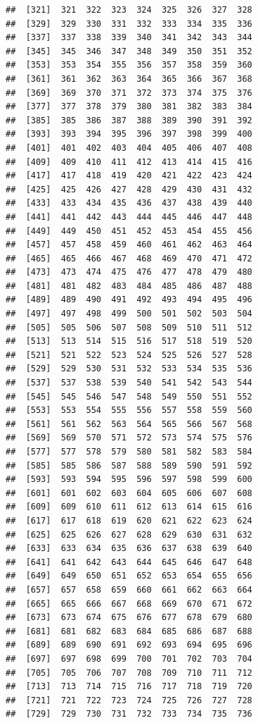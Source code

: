 \documentclass[
]{book}
\begin{document}
\begin{verbatim}
##  [321]  321  322  323  324  325  326  327  328
##  [329]  329  330  331  332  333  334  335  336
##  [337]  337  338  339  340  341  342  343  344
##  [345]  345  346  347  348  349  350  351  352
##  [353]  353  354  355  356  357  358  359  360
##  [361]  361  362  363  364  365  366  367  368
##  [369]  369  370  371  372  373  374  375  376
##  [377]  377  378  379  380  381  382  383  384
##  [385]  385  386  387  388  389  390  391  392
##  [393]  393  394  395  396  397  398  399  400
##  [401]  401  402  403  404  405  406  407  408
##  [409]  409  410  411  412  413  414  415  416
##  [417]  417  418  419  420  421  422  423  424
##  [425]  425  426  427  428  429  430  431  432
##  [433]  433  434  435  436  437  438  439  440
##  [441]  441  442  443  444  445  446  447  448
##  [449]  449  450  451  452  453  454  455  456
##  [457]  457  458  459  460  461  462  463  464
##  [465]  465  466  467  468  469  470  471  472
##  [473]  473  474  475  476  477  478  479  480
##  [481]  481  482  483  484  485  486  487  488
##  [489]  489  490  491  492  493  494  495  496
##  [497]  497  498  499  500  501  502  503  504
##  [505]  505  506  507  508  509  510  511  512
##  [513]  513  514  515  516  517  518  519  520
##  [521]  521  522  523  524  525  526  527  528
##  [529]  529  530  531  532  533  534  535  536
##  [537]  537  538  539  540  541  542  543  544
##  [545]  545  546  547  548  549  550  551  552
##  [553]  553  554  555  556  557  558  559  560
##  [561]  561  562  563  564  565  566  567  568
##  [569]  569  570  571  572  573  574  575  576
##  [577]  577  578  579  580  581  582  583  584
##  [585]  585  586  587  588  589  590  591  592
##  [593]  593  594  595  596  597  598  599  600
##  [601]  601  602  603  604  605  606  607  608
##  [609]  609  610  611  612  613  614  615  616
##  [617]  617  618  619  620  621  622  623  624
##  [625]  625  626  627  628  629  630  631  632
##  [633]  633  634  635  636  637  638  639  640
##  [641]  641  642  643  644  645  646  647  648
##  [649]  649  650  651  652  653  654  655  656
##  [657]  657  658  659  660  661  662  663  664
##  [665]  665  666  667  668  669  670  671  672
##  [673]  673  674  675  676  677  678  679  680
##  [681]  681  682  683  684  685  686  687  688
##  [689]  689  690  691  692  693  694  695  696
##  [697]  697  698  699  700  701  702  703  704
##  [705]  705  706  707  708  709  710  711  712
##  [713]  713  714  715  716  717  718  719  720
##  [721]  721  722  723  724  725  726  727  728
##  [729]  729  730  731  732  733  734  735  736

\end{verbatim}
\end{document}
